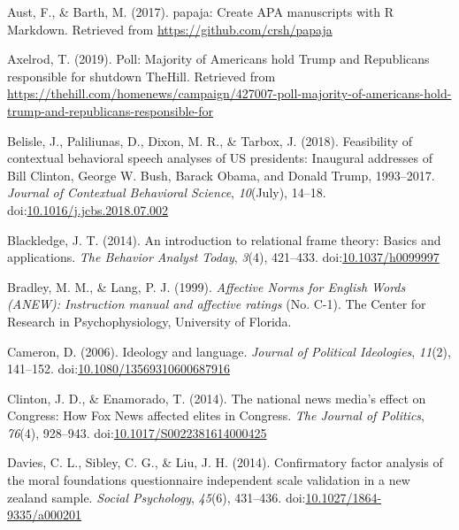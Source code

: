 \documentclass[english,,man]{apa6}
\begin{document}
\begingroup
\setlength{\parindent}{-0.5in}
\setlength{\leftskip}{0.5in}

\hypertarget{refs}{}
\leavevmode\hypertarget{ref-Aust2017}{}%
Aust, F., \& Barth, M. (2017). papaja: Create APA manuscripts with R Markdown. Retrieved from \url{https://github.com/crsh/papaja}

\leavevmode\hypertarget{ref-Axelrod2019}{}%
Axelrod, T. (2019). Poll: Majority of Americans hold Trump and Republicans responsible for shutdown \textbar{} TheHill. Retrieved from \url{https://thehill.com/homenews/campaign/427007-poll-majority-of-americans-hold-trump-and-republicans-responsible-for}

\leavevmode\hypertarget{ref-Belisle2018}{}%
Belisle, J., Paliliunas, D., Dixon, M. R., \& Tarbox, J. (2018). Feasibility of contextual behavioral speech analyses of US presidents: Inaugural addresses of Bill Clinton, George W. Bush, Barack Obama, and Donald Trump, 1993--2017. \emph{Journal of Contextual Behavioral Science}, \emph{10}(July), 14--18. doi:\href{https://doi.org/10.1016/j.jcbs.2018.07.002}{10.1016/j.jcbs.2018.07.002}

\leavevmode\hypertarget{ref-Blackledge2014}{}%
Blackledge, J. T. (2014). An introduction to relational frame theory: Basics and applications. \emph{The Behavior Analyst Today}, \emph{3}(4), 421--433. doi:\href{https://doi.org/10.1037/h0099997}{10.1037/h0099997}

\leavevmode\hypertarget{ref-Bradley1999}{}%
Bradley, M. M., \& Lang, P. J. (1999). \emph{Affective Norms for English Words (ANEW): Instruction manual and affective ratings} (No. C-1). The Center for Research in Psychophysiology, University of Florida.

\leavevmode\hypertarget{ref-Cameron2006}{}%
Cameron, D. (2006). Ideology and language. \emph{Journal of Political Ideologies}, \emph{11}(2), 141--152. doi:\href{https://doi.org/10.1080/13569310600687916}{10.1080/13569310600687916}

\leavevmode\hypertarget{ref-Clinton2014}{}%
Clinton, J. D., \& Enamorado, T. (2014). The national news media's effect on Congress: How Fox News affected elites in Congress. \emph{The Journal of Politics}, \emph{76}(4), 928--943. doi:\href{https://doi.org/10.1017/S0022381614000425}{10.1017/S0022381614000425}

\leavevmode\hypertarget{ref-Davies2014}{}%
Davies, C. L., Sibley, C. G., \& Liu, J. H. (2014). Confirmatory factor analysis of the moral foundations questionnaire independent scale validation in a new zealand sample. \emph{Social Psychology}, \emph{45}(6), 431--436. doi:\href{https://doi.org/10.1027/1864-9335/a000201}{10.1027/1864-9335/a000201}
\end{document}

